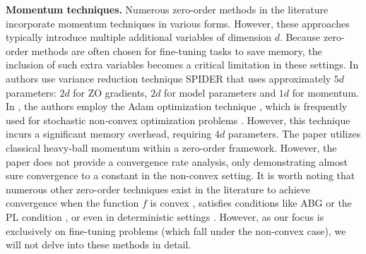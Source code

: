 \documentclass{article}
\theoremstyle{plain}
\theoremstyle{definition}
\theoremstyle{remark}
\begin{document}
\textbf{Momentum techniques.} Numerous zero-order methods in the literature incorporate momentum techniques in various forms. However, these approaches typically introduce multiple additional variables of dimension $d$. Because zero-order methods are often chosen for fine-tuning tasks to save memory, the inclusion of such extra variables becomes a critical limitation in these settings.  In \cite{huang2022accelerated} authors use variance reduction technique SPIDER \cite{fang2018spider} that uses approximately $5d$ parameters: $2d$ for ZO gradients, $2d$ for model parameters and $1d$ for momentum. In \cite{chen2019zo, jiang2024zo}, the authors employ the Adam optimization technique \cite{kingma2014adam}, which is frequently used for stochastic non-convex optimization problems \cite{chen2019zo_adamm,openreview2025mezo_a3dam}. However, this technique incurs a significant memory overhead, requiring $4d$ parameters. The paper \cite{reddy2023convergence} utilizes classical heavy-ball momentum within a zero-order framework. However, the paper does not provide a convergence rate analysis, only demonstrating almost sure convergence to a constant in the non-convex setting. It is worth noting that numerous other zero-order techniques exist in the literature to achieve convergence when the function $f$ is convex \cite{gorbunov2022accelerated,nesterov2017random,duchi2015optimal}, satisfies conditions like ABG \cite{rando2024stochastic} or the PL condition \cite{reddy2023convergence}, or even in deterministic settings \cite{gorbunov2022accelerated}. However, as our focus is exclusively on fine-tuning problems (which fall under the non-convex case), we will not delve into these methods in detail.
\end{document}
